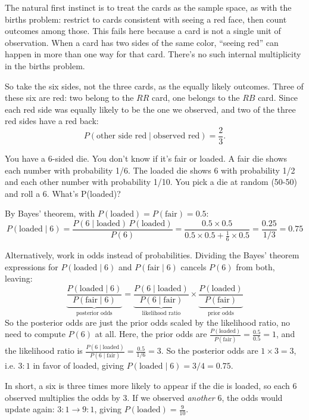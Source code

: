 \begin{solution}
The natural first instinct is to treat the cards as the sample space, as with the births problem: restrict to cards consistent with seeing a red face, then count outcomes among those. This fails here because a card is not a single unit of observation. When a card has two sides of the same color, ``seeing red'' can happen in more than one way for that card. There's no such internal multiplicity in the births problem.

So take the six sides, not the three cards, as the equally likely outcomes. Three of these six are red: two belong to the $RR$ card, one belongs to the $RB$ card. Since each red side was equally likely to be the one we observed, and two of the three red sides have a red back:
\[
P(\text{other side red} \mid \text{observed red}) = \frac{2}{3}.
\]
\end{solution}


\begin{problem}
You have a 6-sided die. You don't know if it's fair or loaded. A fair die shows each number with probability 1/6. The loaded die shows 6 with probability 1/2 and each other number with probability 1/10. You pick a die at random (50-50) and roll a 6. What's P(loaded)?
\end{problem}

\begin{solution}
By Bayes' theorem, with $P(\text{loaded}) = P(\text{fair}) = 0.5$:
\[
P(\text{loaded} \mid 6) = \frac{P(6 \mid \text{loaded}) \, P(\text{loaded})}{P(6)} = \frac{0.5 \times 0.5}{0.5 \times 0.5 + \tfrac{1}{6} \times 0.5} = \frac{0.25}{1/3} = 0.75
\]

Alternatively, work in odds instead of probabilities. Dividing the Bayes' theorem expressions for $P(\text{loaded} \mid 6)$ and $P(\text{fair} \mid 6)$ cancels $P(6)$ from both, leaving:
\[
\underbrace{\frac{P(\text{loaded} \mid 6)}{P(\text{fair} \mid 6)}}_{\text{posterior odds}} = \underbrace{\frac{P(6 \mid \text{loaded})}{P(6 \mid \text{fair})}}_{\text{likelihood ratio}} \times \underbrace{\frac{P(\text{loaded})}{P(\text{fair})}}_{\text{prior odds}}
\]
So the posterior odds are just the prior odds scaled by the likelihood ratio, no need to compute $P(6)$ at all. Here, the prior odds are $\frac{P(\text{loaded})}{P(\text{fair})} = \frac{0.5}{0.5} = 1$, and the likelihood ratio is $\frac{P(6 \mid \text{loaded})}{P(6 \mid \text{fair})} = \frac{0.5}{1/6} = 3$. So the posterior odds are $1 \times 3 = 3$, i.e. $3:1$ in favor of loaded, giving $P(\text{loaded} \mid 6) = 3/4 = 0.75$.

In short, a six is three times more likely to appear if the die is loaded, so each 6 observed multiplies the odds by 3. If we observed \textit{another} 6, the odds would update again: $3:1 \rightarrow 9:1$, giving $P(\text{loaded}) = \frac{9}{10}$.

\end{solution}
